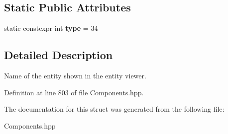 \subsection*{Static Public Attributes}
\begin{DoxyCompactItemize}
\item 
static constexpr int {\bfseries type} = 34\hypertarget{struct_name_component_a7ede491f7f426c8737804e4f5e9b732e}{}\label{struct_name_component_a7ede491f7f426c8737804e4f5e9b732e}

\end{DoxyCompactItemize}


\subsection{Detailed Description}
Name of the entity shown in the entity viewer. 

Definition at line 803 of file Components.\+hpp.



The documentation for this struct was generated from the following file\+:\begin{DoxyCompactItemize}
\item 
Components.\+hpp\end{DoxyCompactItemize}
